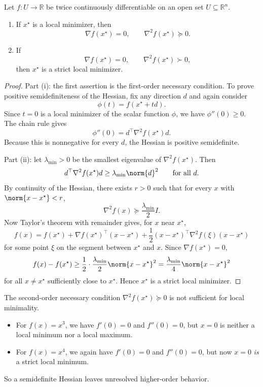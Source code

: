 \begin{theorem}\label{thm:l1-second-order-necessary-and-sufficient-conditions}
	Let $f:U \to \mathbb{R}$ be twice continuously differentiable on an open set $U \subseteq \mathbb{R}^n$.
	\begin{enumerate}[label=(\roman*)]
		\item If $x^\star$ is a local minimizer, then
		      \[
			      \nabla f(x^\star)=0,
			      \qquad
			      \nabla^2 f(x^\star)\succeq 0.
		      \]
		\item If
		      \[
			      \nabla f(x^\star)=0,
			      \qquad
			      \nabla^2 f(x^\star)\succ 0,
		      \]
		      then $x^\star$ is a strict local minimizer.
	\end{enumerate}
\end{theorem}
\begin{proof}
	Part (i): the first assertion is the first-order necessary condition. To prove positive semidefiniteness of the Hessian, fix any direction $d$ and again consider
	\[
		\phi(t)=f(x^\star+td).
	\]
	Since $t=0$ is a local minimizer of the scalar function $\phi$, we have $\phi''(0)\ge 0$. The chain rule gives
	\[
		\phi''(0)=d^\top \nabla^2 f(x^\star)d.
	\]
	Because this is nonnegative for every $d$, the Hessian is positive semidefinite.

	Part (ii): let $\lambda_{\min}>0$ be the smallest eigenvalue of $\nabla^2 f(x^\star)$. Then
	\[
		d^\top \nabla^2 f(x^\star)d \ge \lambda_{\min}\norm{d}^2
		\qquad \text{for all } d.
	\]
	By continuity of the Hessian, there exists $r>0$ such that for every $x$ with $\norm{x-x^\star}<r$,
	\[
		\nabla^2 f(x)\succeq \frac{\lambda_{\min}}{2}I.
	\]
	Now Taylor's theorem with remainder gives, for $x$ near $x^\star$,
	\[
		f(x)=f(x^\star)+\nabla f(x^\star)^\top(x-x^\star)
		+\frac{1}{2}(x-x^\star)^\top \nabla^2 f(\xi)(x-x^\star)
	\]
	for some point $\xi$ on the segment between $x^\star$ and $x$. Since $\nabla f(x^\star)=0$,
	\[
		f(x)-f(x^\star)
		\ge \frac{1}{2}\cdot \frac{\lambda_{\min}}{2}\norm{x-x^\star}^2
		= \frac{\lambda_{\min}}{4}\norm{x-x^\star}^2
	\]
	for all $x \neq x^\star$ sufficiently close to $x^\star$. Hence $x^\star$ is a strict local minimizer.
\end{proof}

\begin{remark}
	The second-order necessary condition $\nabla^2 f(x^\star)\succeq 0$ is not sufficient for local minimality.
	\begin{itemize}
		\item For $f(x)=x^3$, we have $f'(0)=0$ and $f''(0)=0$, but $x=0$ is neither a local minimum nor a local maximum.
		\item For $f(x)=x^4$, we again have $f'(0)=0$ and $f''(0)=0$, but now $x=0$ \emph{is} a strict local minimum.
	\end{itemize}
	So a semidefinite Hessian leaves unresolved higher-order behavior.
\end{remark}

